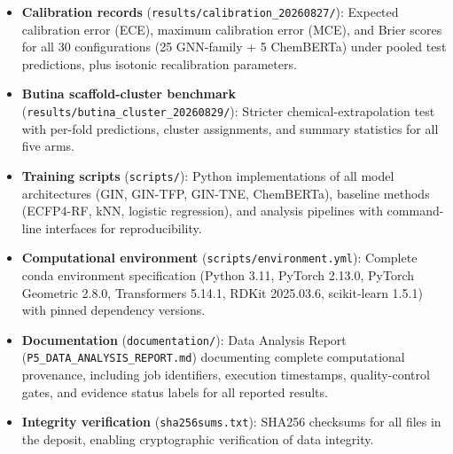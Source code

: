 \documentclass[11pt,a4paper]{article}
\begin{document}
\begin{itemize}[leftmargin=*,itemsep=0.5em]
\item \textbf{Calibration records} (\texttt{results/calibration\_20260827/}): Expected calibration error (ECE), maximum calibration error (MCE), and Brier scores for all 30 configurations (25 GNN-family + 5 ChemBERTa) under pooled test predictions, plus isotonic recalibration parameters.

\item \textbf{Butina scaffold-cluster benchmark} (\texttt{results/butina\_cluster\_20260829/}): Stricter chemical-extrapolation test with per-fold predictions, cluster assignments, and summary statistics for all five arms.

\item \textbf{Training scripts} (\texttt{scripts/}): Python implementations of all model architectures (GIN, GIN-TFP, GIN-TNE, ChemBERTa), baseline methods (ECFP4-RF, kNN, logistic regression), and analysis pipelines with command-line interfaces for reproducibility.

\item \textbf{Computational environment} (\texttt{scripts/environment.yml}): Complete conda environment specification (Python 3.11, PyTorch 2.13.0, PyTorch Geometric 2.8.0, Transformers 5.14.1, RDKit 2025.03.6, scikit-learn 1.5.1) with pinned dependency versions.

\item \textbf{Documentation} (\texttt{documentation/}): Data Analysis Report (\texttt{P5\_DATA\_ANALYSIS\_REPORT.md}) documenting complete computational provenance, including job identifiers, execution timestamps, quality-control gates, and evidence status labels for all reported results.

\item \textbf{Integrity verification} (\texttt{sha256sums.txt}): SHA256 checksums for all files in the deposit, enabling cryptographic verification of data integrity.
\end{itemize}
\end{document}
